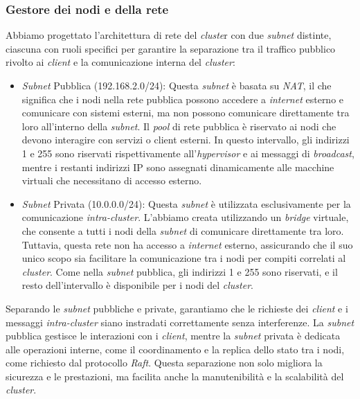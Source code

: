 \subsubsection{Gestore dei nodi e della rete}
Abbiamo progettato l'architettura di rete del \textit{cluste}r con due \textit{subnet} distinte, ciascuna con ruoli specifici per garantire la separazione tra il traffico pubblico rivolto ai \textit{client} e la comunicazione interna del \textit{cluster}:
\begin{itemize}
  \item \textit{Subnet} Pubblica (192.168.2.0/24): Questa \textit{subnet} è basata su \textit{NAT}, il che significa che i nodi nella rete pubblica possono accedere a \textit{internet} esterno e comunicare con sistemi esterni, 
    ma non possono comunicare direttamente tra loro all'interno della \textit{subnet}. Il \textit{pool} di rete pubblica è riservato ai nodi che devono interagire con servizi o client esterni. In questo intervallo, 
    gli indirizzi 1 e 255 sono riservati rispettivamente all'\textit{hypervisor} e ai messaggi di \textit{broadcast}, mentre i restanti indirizzi IP sono assegnati dinamicamente alle macchine virtuali che necessitano di 
    accesso esterno.
  \item \textit{Subnet} Privata (10.0.0.0/24): Questa \textit{subnet} è utilizzata esclusivamente per la comunicazione \textit{intra-cluster}. L'abbiamo creata utilizzando un \textit{bridge} virtuale, che consente a tutti i 
    nodi della \textit{subnet} di comunicare direttamente tra loro. Tuttavia, questa rete non ha accesso a \textit{internet} esterno, assicurando che il suo unico scopo sia facilitare la comunicazione tra i nodi per compiti 
    correlati al \textit{cluster}. Come nella \textit{subnet} pubblica, gli indirizzi 1 e 255 sono riservati, e il resto dell'intervallo è disponibile per i nodi del \textit{cluster}.
\end{itemize}

Separando le \textit{subnet} pubbliche e private, garantiamo che le richieste dei \textit{client} e i messaggi \textit{intra-cluster} siano instradati correttamente senza interferenze. La \textit{subnet} pubblica gestisce 
le interazioni con i \textit{client}, mentre la \textit{subnet} privata è dedicata alle operazioni interne, come il coordinamento e la replica dello stato tra i nodi, come richiesto dal protocollo \textit{Raft}. Questa separazione 
non solo migliora la sicurezza e le prestazioni, ma facilita anche la manutenibilità e la scalabilità del \textit{cluster}.

